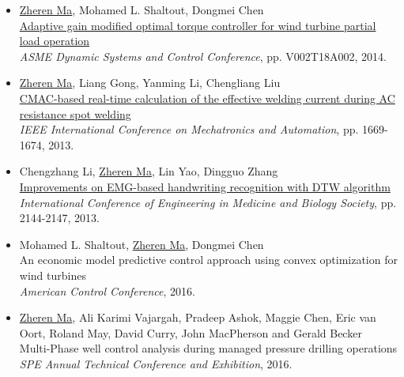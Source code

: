 \documentclass[margin, 9pt]{res} %
\begin{document}
\begin{resume}
\begin{itemize}[leftmargin=*]
	\item \underline{Zheren Ma}, Mohamed L. Shaltout, Dongmei Chen\\
          \href{http://proceedings.asmedigitalcollection.asme.org/proceeding.aspx?articleid=2086149}
          {Adaptive gain modified optimal torque controller for wind turbine partial load operation}\\
          \textit{ASME Dynamic Systems and Control Conference}, pp. V002T18A002, 2014.

	\item \underline{Zheren Ma}, Liang Gong, Yanming Li, Chengliang Liu\\
          \href{http://ieeexplore.ieee.org/xpl/login.jsp?tp=&arnumber=6618166&url=http\%3A\%2F\%2Fieeexplore.ieee.org\%2Fxpls\%2Fabs_all.jsp\%3Farnumber\%3D6618166}
          {CMAC-based real-time calculation of the effective welding current during AC resistance spot welding}\\
          \textit{IEEE International Conference on Mechatronics and Automation}, pp. 1669-1674, 2013.

	\item Chengzhang Li, \underline{Zheren Ma}, Lin Yao, Dingguo Zhang\\
          \href{http://ieeexplore.ieee.org/xpl/login.jsp?tp=&arnumber=6609958&url=http\%3A\%2F\%2Fieeexplore.ieee.org\%2Fiel7\%2F6596169\%2F6609410\%2F06609958.pdf\%3Farnumber\%3D6609958}
          {Improvements on EMG-based handwriting recognition with DTW algorithm}\\
          \textit{ International Conference of Engineering in Medicine and Biology Society}, pp. 2144-2147, 2013.

    \item Mohamed L. Shaltout, \underline{Zheren Ma}, Dongmei Chen\\
          {An economic model predictive control approach using convex optimization for wind turbines}\\
          \textit{American Control Conference}, 2016.
    \item \underline{Zheren Ma}, Ali Karimi Vajargah, Pradeep Ashok, Maggie Chen, Eric van Oort, Roland May, David Curry, John MacPherson and Gerald Becker \\
        {Multi-Phase well control analysis during managed pressure drilling operations}\\
       \textit{SPE Annual Technical Conference and Exhibition}, 2016.


\end{itemize}


\end{resume}
\end{document}
